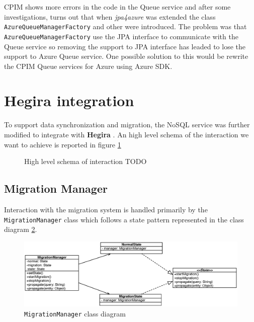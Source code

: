 \newparagraph CPIM shows more errors in the code in the Queue service and after some investigations, turns out that when \textit{jpa4azure} was extended the class \texttt{AzureQueueManagerFactory} and other were introduced.
The problem was that \texttt{AzureQueueManagerFactory} use the JPA interface to communicate with the Queue service so removing the support to JPA interface has leaded to lose the support to Azure Queue service.
One possible solution to this would be rewrite the CPIM Queue services for Azure using Azure SDK.

\section{Hegira integration}
\label{sec:hegira}
To support data synchronization and migration, the NoSQL service was further modified to integrate with \textbf{Hegira} \cite{thesis:marco}. An high level schema of the interaction we want to achieve is reported in figure \ref{fig:high-level-interaction}

\begin{figure}[tbh]
  \centering
  \begin{minipage}[c][0.33\textheight][c]{0.5\textwidth}
  \end{minipage}
  \caption{High level schema of interaction TODO}
  \label{fig:high-level-interaction}
\end{figure} 

\subsection{Migration Manager}
Interaction with the migration system is handled primarily by the \texttt{MigrationManager} class which follows a state pattern represented in the class diagram \ref{fig:migration-class-diagram}. 
 
\begin{figure}[tbh]
  \centering
  \includegraphics[width=14cm]{images/migration_class_diagram}
  \caption{\texttt{MigrationManager} class diagram}
  \label{fig:migration-class-diagram}
\end{figure} 

